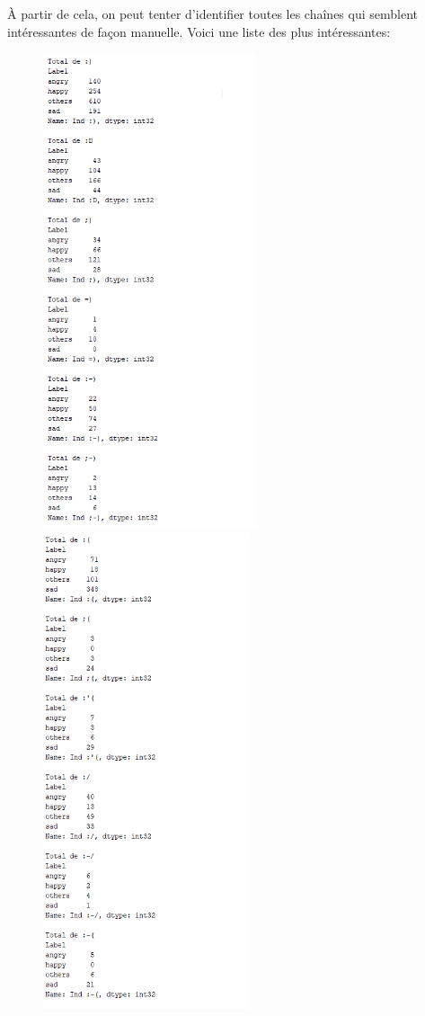 \documentclass[12pt,french]{article}
\begin{document}
À partir de cela, on peut tenter d'identifier toutes les chaînes qui semblent intéressantes de façon manuelle. Voici une liste des plus intéressantes: 

\begin{figure}[h!] %
	\begin{minipage}[b]{0.3\textwidth}
		\includegraphics[width=\textwidth,height=14cm]{analyse_emojis_car_pos}
	\end{minipage}
	\hfill
	\begin{minipage}[b]{0.3\textwidth}
		\includegraphics[width=\textwidth,height=14cm]{analyse_emojis_car_neg}

\end{minipage}
\end{figure}
\end{document}
